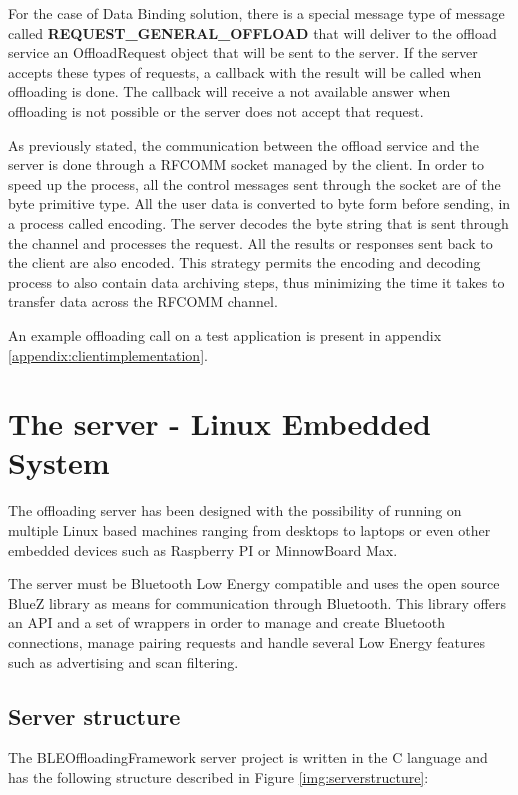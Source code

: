 For the case of Data Binding solution, there is a special message type of message called \textbf{REQUEST_GENERAL_OFFLOAD} that will deliver to the offload service an OffloadRequest object that will be sent to the server. If the server accepts these types of requests, a callback with the result will be called when offloading is done. The callback will receive a not available answer when offloading is not possible or the server does not accept that request.

As previously stated, the communication between the offload service and the server is done through a RFCOMM socket managed by the client. In order to speed up the process, all the control messages sent through the socket are of the byte primitive type. All the user data is converted to byte form before sending, in a process called encoding. The server decodes the byte string that is sent through the channel and processes the request. All the results or responses sent back to the client are also encoded. This strategy permits the encoding and decoding process to also contain data archiving steps, thus minimizing the time it takes to transfer data across the RFCOMM channel.

An example offloading call on a test application is present in appendix \ref{appendix:clientimplementation}.

\pagebreak

\section{The server - Linux Embedded System}

The offloading server has been designed with the possibility of running on multiple Linux based machines ranging from desktops to laptops or even other embedded devices such as Raspberry PI or MinnowBoard Max.

The server must be Bluetooth Low Energy compatible and uses the open source BlueZ\cite{holtmann2007bluez} library as means for communication through Bluetooth. This library offers an API and a set of wrappers in order to manage and create Bluetooth connections, manage pairing requests and handle several Low Energy features such as advertising and scan filtering.


\subsection{Server structure}
\label{subsection:serverstructure}

The BLEOffloadingFramework server project is written in the C language and has the following structure described in Figure \ref{img:serverstructure}:

